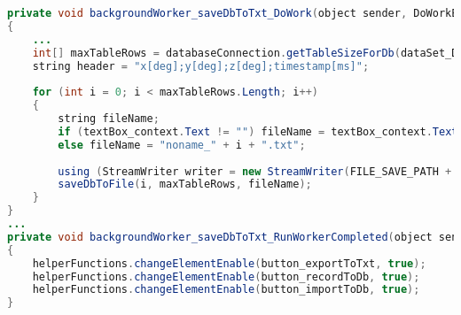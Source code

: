 \label{lst:exportDb}
\begin{lstlisting}[language=Java, caption=Datenbank exportieren]
private void backgroundWorker_saveDbToTxt_DoWork(object sender, DoWorkEventArgs e)
{
	...
	int[] maxTableRows = databaseConnection.getTableSizeForDb(dataSet_Db1);
	string header = "x[deg];y[deg];z[deg];timestamp[ms]";
	
	for (int i = 0; i < maxTableRows.Length; i++)
	{
		string fileName;
		if (textBox_context.Text != "") fileName = textBox_context.Text + "_" + i + ".txt";
		else fileName = "noname_" + i + ".txt";
		
		using (StreamWriter writer = new StreamWriter(FILE_SAVE_PATH + fileName, false)) writer.WriteLine(header);
		saveDbToFile(i, maxTableRows, fileName);
	}
}
...
private void backgroundWorker_saveDbToTxt_RunWorkerCompleted(object sender, RunWorkerCompletedEventArgs e)
{
	helperFunctions.changeElementEnable(button_exportToTxt, true);
    helperFunctions.changeElementEnable(button_recordToDb, true);
    helperFunctions.changeElementEnable(button_importToDb, true);
}
\end{lstlisting}